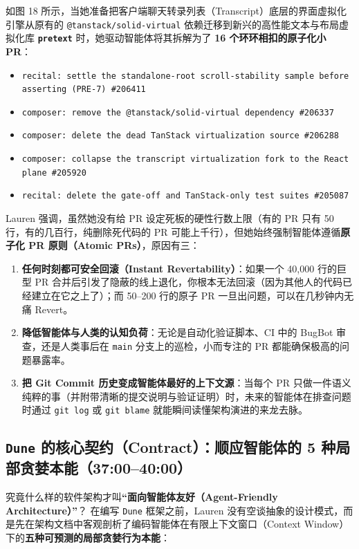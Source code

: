 \documentclass[a4paper]{article}
\begin{document}
如图 18 所示，当她准备把客户端聊天转录列表（Transcript）底层的界面虚拟化引擎从原有的 \texttt{@tanstack/solid-virtual} 依赖迁移到新兴的高性能文本与布局虚拟化库 \textbf{\texttt{pretext}} 时，她驱动智能体将其拆解为了 \textbf{16 个环环相扣的原子化小 PR}：
\begin{itemize}
  \item \texttt{recital: settle the standalone-root scroll-stability sample before asserting (PRE-7) \#206411}
  \item \texttt{composer: remove the @tanstack/solid-virtual dependency \#206337}
  \item \texttt{composer: delete the dead TanStack virtualization source \#206288}
  \item \texttt{composer: collapse the transcript virtualization fork to the React plane \#205920}
  \item \texttt{recital: delete the gate-off and TanStack-only test suites \#205087}
\end{itemize}

Lauren 强调，虽然她没有给 PR 设定死板的硬性行数上限（有的 PR 只有 50 行，有的几百行，纯删除死代码的 PR 可能上千行），但她始终强制智能体遵循\textbf{原子化 PR 原则（Atomic PRs）}，原因有三：
\begin{enumerate}
  \item \textbf{任何时刻都可安全回滚（Instant Revertability）}：如果一个 40,000 行的巨型 PR 合并后引发了隐蔽的线上退化，你根本无法回滚（因为其他人的代码已经建立在它之上了）；而 50--200 行的原子 PR 一旦出问题，可以在几秒钟内无痛 Revert。
  \item \textbf{降低智能体与人类的认知负荷}：无论是自动化验证脚本、CI 中的 BugBot 审查，还是人类事后在 \texttt{main} 分支上的巡检，小而专注的 PR 都能确保极高的问题暴露率。
  \item \textbf{把 Git Commit 历史变成智能体最好的上下文源}：当每个 PR 只做一件语义纯粹的事（并附带清晰的提交说明与验证证明）时，未来的智能体在排查问题时通过 \texttt{git log} 或 \texttt{git blame} 就能瞬间读懂架构演进的来龙去脉。
\end{enumerate}

\subsection{\texttt{Dune} 的核心契约（Contract）：顺应智能体的 5 种局部贪婪本能（37:00--40:00）}

究竟什么样的软件架构才叫\textbf{“面向智能体友好（Agent-Friendly Architecture）”}？
在编写 \texttt{Dune} 框架之前，Lauren 没有空谈抽象的设计模式，而是先在架构文档中客观剖析了编码智能体在有限上下文窗口（Context Window）下的\textbf{五种可预测的局部贪婪行为本能}：
\end{document}
